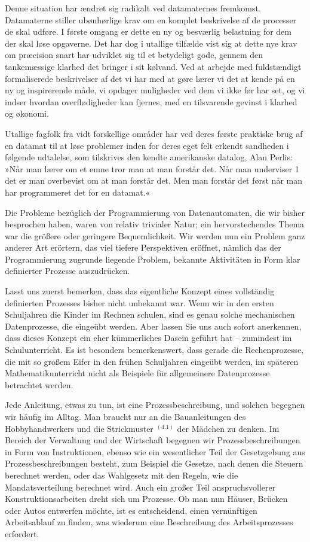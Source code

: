 {Denne situation har ændret sig radikalt ved datamaternes fremkomst. Datamaterne stiller ubønhørlige krav om en komplet beskrivelse af de processer de skal udføre. I første omgang er dette en ny og besværlig belastning for dem der skal løse opgaverne. Det har dog i utallige tilfælde vist sig at dette nye krav om præcision snart har udviklet sig til et betydeligt gode, gennem den tankemæssige klarhed det bringer i sit kølvand. Ved at arbejde med fuldstændigt formaliserede beskrivelser af det vi har med at gøre lærer vi det at kende på en ny og inspirerende måde, vi opdager muligheder ved dem vi ikke før har set, og vi indser hvordan overflødigheder kan fjernes, med en tilsvarende gevinst i klarhed og økonomi. 

Utallige fagfolk fra vidt forskellige områder har ved deres første praktiske brug af en datamat til at løse problemer inden for deres eget felt erkendt sandheden i følgende udtalelse, som tilskrives den kendte amerikanske datalog, Alan Perlis: »Når man lærer om et emne tror man at man forstår det. Når man underviser 1 det er man overbevist om at man forstår det. Men man forstår det først når man har programmeret det for en datamat.« 
}{
Die Probleme bezüglich der Programmierung von Datenautomaten, die wir bisher besprochen haben, waren von relativ trivialer Natur; ein hervorstechendes Thema war die größere oder geringere Bequemlichkeit. Wir werden nun ein Problem ganz anderer Art erörtern, das viel tiefere Perspektiven eröffnet, nämlich das der Programmierung zugrunde liegende Problem, bekannte Aktivitäten in Form klar definierter Prozesse auszudrücken.

Lasst uns zuerst bemerken, dass das eigentliche Konzept eines vollständig definierten Prozesses bisher nicht unbekannt war. Wenn wir in den ersten Schuljahren die Kinder im Rechnen schulen, sind es genau solche mechanischen Datenprozesse, die eingeübt werden. Aber lassen Sie uns auch sofort anerkennen, dass dieses Konzept ein eher kümmerliches Dasein geführt hat -- zumindest im Schulunterricht. Es ist besonders bemerkenswert, dass gerade die Rechenprozesse, die mit so großem Eifer in den frühen Schuljahren eingeübt werden, im späteren Mathematikunterricht nicht als Beispiele für allgemeinere Datenprozesse betrachtet werden.

Jede Anleitung, etwas zu tun, ist eine Prozessbeschreibung, und solchen begegnen wir häufig im Alltag. Man braucht nur an die Bauanleitungen des Hobbyhandwerkers und die Strickmuster $^{(4.1)}$ der Mädchen zu denken. Im Bereich der Verwaltung und der Wirtschaft begegnen wir Prozessbeschreibungen in Form von Instruktionen, ebenso wie ein wesentlicher Teil der Gesetzgebung aus Prozessbeschreibungen besteht, zum Beispiel die Gesetze, nach denen die Steuern berechnet werden, oder das Wahlgesetz mit den Regeln, wie die Mandatsverteilung berechnet wird. Auch ein großer Teil anspruchsvollerer Konstruktionsarbeiten dreht sich um Prozesse. Ob man nun Häuser, Brücken oder Autos entwerfen möchte, ist es entscheidend, einen vernünftigen Arbeitsablauf zu finden, was wiederum eine Beschreibung des Arbeitsprozesses erfordert.

}
